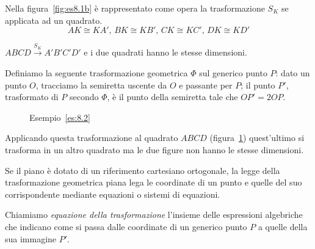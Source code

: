 \begin{exrig}
\begin{esempio}
Nella figura~\ref{fig:es8.1b} è rappresentato come opera la 
trasformazione $S_K$ se applicata ad un quadrato.
\[AK\cong KA'\text{, }BK\cong KB'\text{, }CK\cong KC'\text{, }DK\cong 
KD'\]

$ABCD\overset{S_K}{\rightarrow}A'B'C'D'$ e i due quadrati hanno le 
stesse dimensioni.
\end{esempio}

\begin{esempio}\label{es:8.2}
Definiamo la seguente trasformazione geometrica $\Phi$ sul generico 
punto $P$: dato un punto $O$, tracciamo la semiretta uscente da $O$ e 
passante per $P$; il punto $P'$, trasformato di $P$ secondo $\Phi$, è 
il punto della semiretta tale che $OP'=2OP$.\vspace{7pt}


\begin{inaccessibleblock}
 \begin{figure}[!htb]
    \centering
	\caption{Esempio~\ref{es:8.2}}\label{fig:es8.2}
\end{figure}
\end{inaccessibleblock}

Applicando questa trasformazione al quadrato $ABCD$ 
(figura~\ref{fig:es8.2}) quest'ultimo si trasforma in un altro 
quadrato ma le due figure non hanno le stesse dimensioni.
\end{esempio}
\end{exrig}

Se il piano è dotato di un riferimento cartesiano ortogonale, la 
legge della trasformazione geometrica piana lega le coordinate di un 
punto e quelle del suo corrispondente mediante equazioni o sistemi di 
equazioni.
 
\begin{definizione}
Chiamiamo \emph{equazione della trasformazione} l'insieme delle 
espressioni algebriche che indicano come si passa dalle coordinate di 
un generico punto $P$ a quelle della sua immagine $P'$.
\end{definizione}


